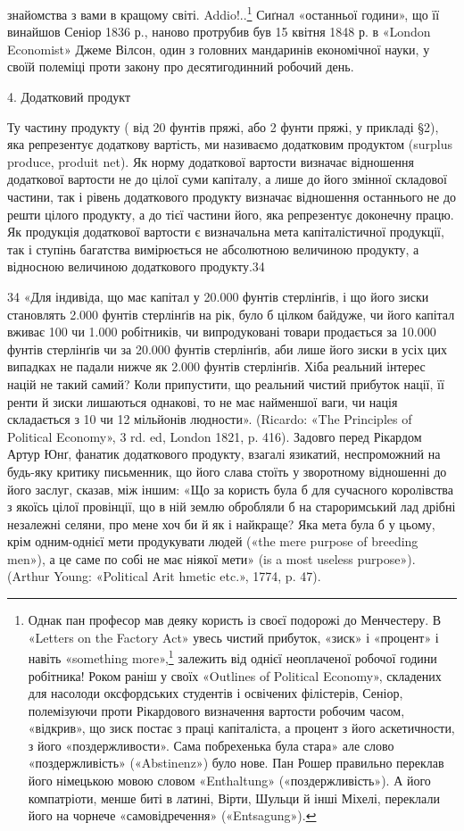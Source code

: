 знайомства з вами в кращому світі. Addio!..\footnote{
Однак пан професор мав деяку користь із своєї подорожі до Менчестеру. В «Letters on the
Factory Act» увесь чистий прибуток, «зиск» і «процент» і навіть «something more»,\footnote*{
— щось більше. Ред,
} залежить від
однієї неоплаченої
робочої години робітника! Роком раніш у своїх «Outlines of Political Economy», складених для
насолоди оксфордських студентів і освічених філістерів, Сеніор, полемізуючи проти Рікардового
визначення вартости робочим часом, «відкрив», що зиск постає з праці капіталіста, а процент з його
аскетичности, з його «поздержливости». Сама побрехенька була стара» але слово «поздержливість»
(«Abstinenz») було нове. Пан Рошер правильно переклав його німецькою мовою словом «Enthaltung»
(«поздержливість»). А його компатріоти, менше биті в латині, Вірти, Шульци
й інші Міхелі, переклали його на чорнече «самовідречення» («Entsagung»).
} Сиґнал «останньої години», що її винайшов Сеніор 1836
р., наново протрубив був 15 квітня 1848 р. в «London Economist» Джеме Вілсон, один з головних
мандаринів економічної науки, у своїй полеміці проти
закону про десятигодинний робочий день.

4. Додатковий продукт

Ту частину продукту ( від 20 фунтів пряжі, або 2 фунти пряжі, у прикладі §2), яка репрезентує
додаткову вартість, ми
називаємо додатковим продуктом (surplus produce, produit net). Як норму додаткової вартости визначає
відношення додаткової
вартости не до цілої суми капіталу, а лише до його змінної складової частини, так і рівень
додаткового продукту визначає відношення останнього не до решти цілого продукту, а до тієї частини
його, яка репрезентує доконечну працю. Як продукція додаткової вартости є визначальна мета
капіталістичної продукції, так і ступінь багатства вимірюється не абсолютною величиною
продукту, а відносною величиною додаткового продукту.34

34 «Для індивіда, що має капітал у 20.000 фунтів стерлінґів, і що його зиски становлять 2.000 фунтів
стерлінґів на рік, було б цілком байдуже, чи його капітал вживає 100 чи 1.000 робітників, чи
випродуковані товари продається за 10.000 фунтів стерлінґів чи за 20.000 фунтів стерлінґів, аби лише
його зиски в усіх цих випадках не падали нижче як 2.000 фунтів
стерлінґів. Хіба реальний інтерес націй не такий самий? Коли припустити, що реальний чистий прибуток
нації, її ренти й зиски лишаються однакові, то не має найменшої ваги, чи нація складається з 10 чи
12 мільйонів людности». (Ricardo: «The Principles of Political Economy», 3 rd. ed, London 1821, p.
416). Задовго перед Рікардом Артур Юнґ, фанатик додаткового продукту, взагалі язикатий, неспроможний
на будь-яку критику письменник, що його слава стоїть у зворотному відношенні
до його заслуг, сказав, між іншим: «Що за користь була б для сучасного королівства з якоїсь цілої
провінції, що в ній землю обробляли б на староримський лад дрібні незалежні селяни, про мене хоч би
й як і найкраще? Яка мета була б у цьому, крім одним-однієї мети продукувати людей
(«the mere purpose of breeding men»), а це саме по собі не має ніякої мети» (is a most useless
purpose»). (Arthur Young: «Political Arit hmetic etc.», 1774, p. 47).

